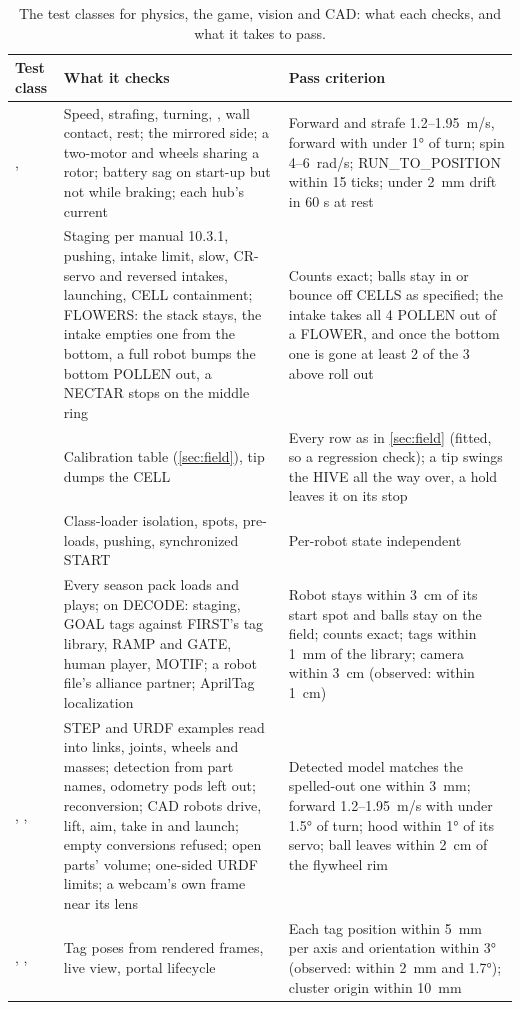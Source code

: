 \documentclass[10pt,twocolumn,letterpaper]{article}
\begin{document}
\begin{table}[tp]
\centering
\footnotesize
\caption{The test classes for physics, the game, vision and CAD: what each checks, and what it takes to pass.}\label{tab:tests2}
\begin{tabularx}{\textwidth}{@{}>{\raggedright\arraybackslash}p{4.0cm}>{\raggedright\arraybackslash}p{5.2cm}L@{}}
\toprule
\textbf{Test class} & \textbf{What it checks} & \textbf{Pass criterion} \\
\midrule
{},  & Speed, strafing, turning, , wall contact, rest; the mirrored side; a two-motor  and wheels sharing a rotor; battery sag on start-up but not while braking; each hub's current & Forward and strafe 1.2–1.95~m/s, forward with under 1° of turn; spin 4–6~rad/s; RUN\_TO\_POSITION within 15 ticks; under 2~mm drift in 60 s at rest \\
 & Staging per manual 10.3.1, pushing, intake limit, slow, CR-servo and reversed intakes, launching, CELL containment; FLOWERS: the stack stays, the intake empties one from the bottom, a full robot bumps the bottom POLLEN out, a NECTAR stops on the middle ring & Counts exact; balls stay in or bounce off CELLS as specified; the intake takes all 4 POLLEN out of a FLOWER, and once the bottom one is gone at least 2 of the 3 above roll out \\
 & Calibration table (\cref{sec:field}), tip dumps the CELL & Every row as in \cref{sec:field} (fitted, so a regression check); a tip swings the HIVE all the way over, a hold leaves it on its stop \\
 & Class-loader isolation, spots, pre-loads, pushing, synchronized START & Per-robot state independent \\
 & Every season pack loads and plays; on DECODE: staging, GOAL tags against FIRST's tag library, RAMP and GATE, human player, MOTIF; a robot file's alliance partner; AprilTag localization & Robot stays within 3~cm of its start spot and balls stay on the field; counts exact; tags within 1~mm of the library; camera within 3~cm (observed: within 1~cm) \\
, ,  & STEP and URDF examples read into links, joints, wheels and masses; detection from part names, odometry pods left out; reconversion; CAD robots drive, lift, aim, take in and launch; empty conversions refused; open parts' volume; one-sided URDF limits; a webcam's own frame near its lens & Detected model matches the spelled-out one within 3~mm; forward 1.2–1.95~m/s with under 1.5° of turn; hood within 1° of its servo; ball leaves within 2~cm of the flywheel rim \\
, ,  & Tag poses from rendered frames, live view, portal lifecycle & Each tag position within 5~mm per axis and orientation within 3° (observed: within 2~mm and 1.7°); cluster origin within 10~mm \\
\bottomrule
\end{tabularx}
\end{table}
\end{document}
